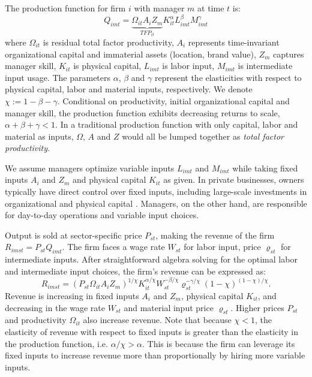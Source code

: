 \documentclass[11pt,a4paper]{article}
\begin{document}
The production function for firm $i$ with manager $m$ at time $t$ is:
\begin{equation}\label{eq:production}
Q_{imt} = \underbrace{\Omega_{it}A_i Z_{m}}_{TFP_{it}}  K_{it}^\alpha L_{imt}^{\beta} M_{imt}^{\gamma}
\end{equation}
where $\Omega_{it}$ is residual total factor productivity, $A_i$ represents time-invariant organizational capital and immaterial assets (location, brand value), $Z_m$ captures manager skill, $K_{it}$ is physical capital, $L_{imt}$ is labor input, $M_{imt}$ is intermediate input usage. The parameters $\alpha$, $\beta$ and $\gamma$ represent the elasticities with respect to physical capital, labor and material inputs, respectively. We denote $\chi := 1 - \beta - \gamma$. Conditional on productivity, initial organizational capital and manager skill, the production function exhibits decreasing returns to scale, $\alpha + \beta + \gamma < 1$. In a traditional production function with only capital, labor and material as inputs, $\Omega$, $A$ and $Z$ would all be lumped together as \emph{total factor productivity}.

We assume managers optimize variable inputs $L_{imt}$ and $M_{imt}$ while taking fixed inputs $A_{i}$ and $Z_m$ and physical capital $K_{it}$ as given. In private businesses, owners typically have direct control over fixed inputs, including large-scale investments in organizational and physical capital \citep{Navaretti2010EFIGE}. Managers, on the other hand, are responsible for day-to-day operations and variable input choices.

Output is sold at sector-specific price $P_{st}$, making the revenue of the firm $R_{imst} = P_{st}Q_{imt}$. The firm faces a wage rate $W_{st}$ for labor input, price $\varrho_{st}$ for intermediate inputs. After straightforward algebra solving for the optimal labor and intermediate input choices, the firm's revenue can be expressed as:
\begin{equation}\label{eq:revenue}
R_{imst} = (P_{st}\Omega_{it}A_i Z_m)^{1/\chi}
K_{it}^{\alpha/\chi}
W_{st}^{-\beta/\chi}
\varrho_{st}^{-\gamma/\chi}
(1-\chi)^{(1-\chi)/\chi}.
\end{equation}
Revenue is increasing in fixed inputs $A_i$ and $Z_m$, physical capital $K_{it}$, and decreasing in the wage rate $W_{st}$ and material input price $\varrho_{st}$. Higher prices $P_{st}$ and productivity $\Omega_{it}$ also increase revenue. Note that because $\chi<1$, the elasticity of revenue with respect to fixed inputs is greater than the elasticity in the production function, i.e. $\alpha/\chi > \alpha$. This is because the firm can leverage its fixed inputs to increase revenue more than proportionally by hiring more variable inputs.
\end{document}

